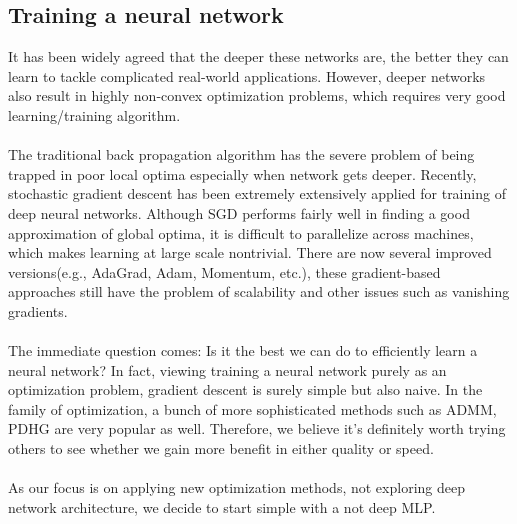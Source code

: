 \documentclass[11pt]{report}
\begin{document}
\subsection*{Training a neural network}
It has been widely agreed that the deeper these networks are, the better they can learn to tackle complicated real-world applications. However, deeper networks also result in highly non-convex optimization problems, which requires very good learning/training algorithm. \\
\\
The traditional back propagation algorithm has the severe problem of being trapped in poor local optima especially when network gets deeper. Recently, stochastic gradient descent has been extremely extensively applied for training of deep neural networks. Although SGD performs fairly well in finding a good approximation of global optima, it is difficult to parallelize across machines, which makes learning at large scale nontrivial.  There are now several improved versions(e.g., AdaGrad, Adam, Momentum, etc.), these gradient-based approaches still have the problem of scalability and other issues such as vanishing gradients.\\
\\
The immediate question comes: Is it the best we can do to efficiently learn a neural network?  In fact, viewing training a neural network purely as an optimization problem, gradient descent is surely simple but also naive.  In the family of optimization, a bunch of more sophisticated methods such as ADMM, PDHG are very popular as well. Therefore, we believe it's definitely worth trying others to see whether we gain more benefit in either quality or speed.
\\\\
As our focus is on applying new optimization methods, not exploring deep network architecture, we decide to start simple with a not deep MLP.
\end{document}
